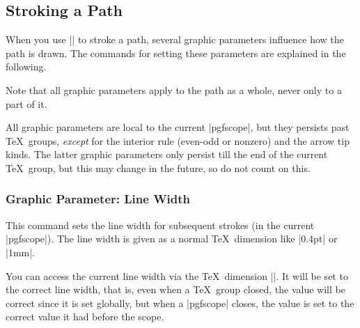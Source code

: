 \subsection{Stroking a Path}
\label{section-stroke}

When you use || to stroke a path, several graphic
parameters influence how the path is drawn. The commands for setting
these parameters are explained in the following.

Note that all graphic parameters apply to the path as a whole, never
only to a part of it.

All graphic parameters are local to the current |{pgfscope}|, but they
persists past \TeX\ groups, \emph{except} for the interior rule
(even-odd or nonzero) and the arrow tip kinds. The latter graphic
parameters only persist till the end of the current \TeX\ group, but
this may change in the future, so do not count on this.

\subsubsection{Graphic Parameter: Line Width}

\begin{command}{\pgfsetlinewidth{}}
  This command sets the line width for subsequent strokes (in the
  current |pgfscope|). The line width is given as a normal \TeX\
  dimension like |0.4pt| or |1mm|.

\begin{codeexample}[]
\begin{pgfpicture}
  \pgfsetlinewidth{1mm}
  \pgfpathmoveto{\pgfpoint{0mm}{0mm}}
  \pgfpathlineto{\pgfpoint{2cm}{0mm}}
  \pgfsetlinewidth{2\pgflinewidth} %
  \pgfpathmoveto{\pgfpoint{0mm}{5mm}}
  \pgfpathlineto{\pgfpoint{2cm}{5mm}}
\end{pgfpicture}
\end{codeexample}
\end{command}

\begin{textoken}{\pgflinewidth}
  You can access the current line width via the \TeX\ dimension
  |\pgflinewidth|. It will be set to the correct line width, that is,
  even when a \TeX\ group closed, the value will be correct since it
  is set globally, but when a |{pgfscope}| closes, the value is set to
  the correct value it had before the scope.
\end{textoken}


